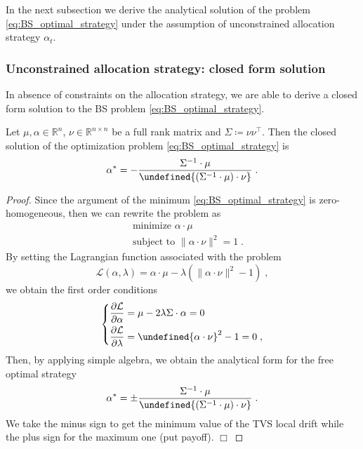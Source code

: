 \documentclass[runningheads]{m2ef}
\newcommand{\tr}[1]{{#1}^{\intercal}} %
\newenvironment{eqsys}{\begin{equation}\begin{dcases}}{\end{dcases}\end{equation}}
\let\norm\undefined %
\DeclarePairedDelimiter\norm{\lVert}{\rVert}
\begin{document}
	In the next subsection we derive the analytical solution of the problem \eqref{eq:BS_optimal_strategy} under the assumption of unconstrained allocation strategy $\alpha_t$.


	\subsubsection{Unconstrained allocation strategy: closed form solution}
	In absence of constraints on the allocation strategy, we are able to derive a closed form solution to the BS problem \eqref{eq:BS_optimal_strategy}.
	\begin{lemma}
		Let $\mu, \alpha \in \mathbb{R}^n$, $\nu \in \mathbb{R}^{n\times n}$ be a full rank matrix and $\Sigma\coloneqq \nu \tr{\nu}$. Then the closed solution of the optimization problem \eqref{eq:BS_optimal_strategy} is 
		\begin{equation}
				\alpha^* = - \frac{\Sigma^{-1} \cdot \mu}{\norm{(\Sigma^{-1} \cdot \mu)\cdot \nu}} \; .
		\end{equation}
	\end{lemma}
	\begin{proof}
	Since the argument of the minimum \eqref{eq:BS_optimal_strategy} is zero-homogeneous, then we can rewrite the problem as
	\begin{equation}
			\begin{aligned}
				&\text { minimize } \alpha \cdot \mu\\
				&\text { subject to } \|\alpha \cdot \nu\|^2=1 \; .
		\end{aligned}
	\end{equation}
	By setting the Lagrangian function associated with the problem
	\begin{equation}
		\mathcal{L}\left(\alpha, \lambda\right)=\alpha \cdot \mu-\lambda\left(\|\alpha \cdot \nu\|^2-1\right) \; ,
	\end{equation}
	we obtain the first order conditions
	\begin{eqsys}
		\frac{\partial \mathcal{L}}{\partial \alpha}=\mu -2\lambda \Sigma \cdot \alpha=0 \\
		\frac{\partial \mathcal{L}}{\partial \lambda}= \norm{\alpha \cdot \nu}^2-1=0
		\; ,
	\end{eqsys}
	Then, by applying simple algebra, we obtain the analytical form for the free optimal strategy
	\begin{equation}
		\alpha^* = \pm \frac{\Sigma^{-1} \cdot \mu}{\norm{(\Sigma^{-1} \cdot \mu)\cdot \nu}} \; .
	\label{eq:analytical_solution_free_strategy}\end{equation}
	We take the minus sign to get the minimum value of the TVS local drift while the plus sign for the maximum one (put payoff). $\Box$
	\end{proof}
\end{document}

